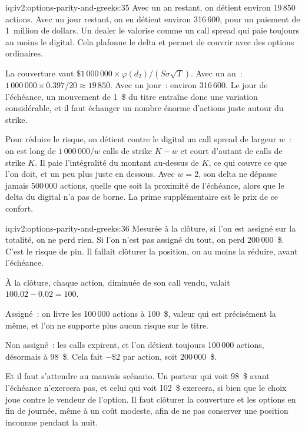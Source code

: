 \begin{solution}{iq:iv2:options-parity-and-greeks:35}
Avec un an restant, on détient environ 19\,850 actions. Avec un jour restant, on en détient environ 316\,600, pour un paiement de 1~million de dollars. Un dealer le valorise comme un call spread qui paie toujours au moins le digital. Cela plafonne le delta et permet de couvrir avec des options ordinaires.

La couverture vaut $\$1\,000\,000 \times \varphi(d_2)/(S\sigma\sqrt T)$. Avec un an~: $1\,000\,000 \times 0.397/20 \approx 19\,850$. Avec un jour~: environ 316\,600. Le jour de l'échéance, un mouvement de 1~\$ du titre entraîne donc une variation considérable, et il faut échanger un nombre énorme d'actions juste autour du strike.

Pour réduire le risque, on détient contre le digital un call spread de largeur $w$~: on est long de $1\,000\,000/w$ calls de strike $K - w$ et court d'autant de calls de strike $K$. Il paie l'intégralité du montant au-dessus de $K$, ce qui couvre ce que l'on doit, et un peu plus juste en dessous. Avec $w = 2$, son delta ne dépasse jamais 500\,000 actions, quelle que soit la proximité de l'échéance, alors que le delta du digital n'a pas de borne. La prime supplémentaire est le prix de ce confort.

\end{solution}

\begin{solution}{iq:iv2:options-parity-and-greeks:36}
Mesurée à la clôture, si l'on est assigné sur la totalité, on ne perd rien. Si l'on n'est pas assigné du tout, on perd 200\,000~\$. C'est le risque de pin. Il fallait clôturer la position, ou au moins la réduire, avant l'échéance.

À la clôture, chaque action, diminuée de son call vendu, valait $100.02 - 0.02 = 100$.

Assigné~: on livre les 100\,000 actions à 100~\$, valeur qui est précisément la même, et l'on ne supporte plus aucun risque sur le titre.

Non assigné~: les calls expirent, et l'on détient toujours 100\,000 actions, désormais à 98~\$. Cela fait $-\$2$ par action, soit 200\,000~\$.

Et il faut s'attendre au mauvais scénario. Un porteur qui voit 98~\$ avant l'échéance n'exercera pas, et celui qui voit 102~\$ exercera, si bien que le choix joue contre le vendeur de l'option. Il faut clôturer la couverture et les options en fin de journée, même à un coût modeste, afin de ne pas conserver une position inconnue pendant la nuit.

\end{solution}

